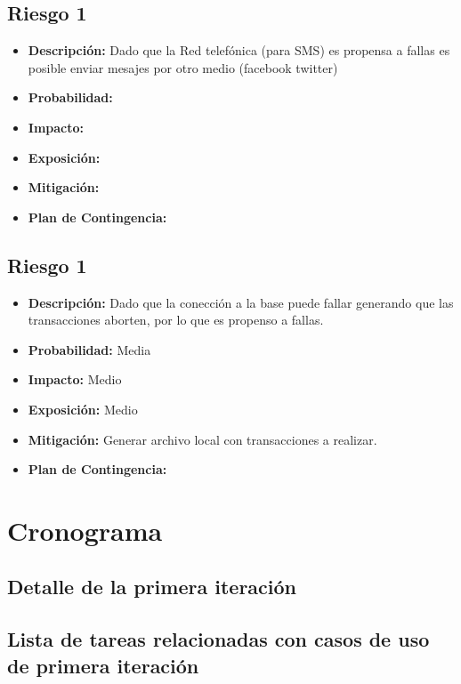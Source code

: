 \documentclass[a4paper, 11pt]{article}
\begin{document}
\subsection{Riesgo 1}
\begin{itemize}

\item \textbf{Descripci\'on:} Dado que la Red telefónica (para SMS) es propensa a fallas es posible enviar mesajes por otro medio (facebook twitter)
\item \textbf{Probabilidad:}
\item \textbf{Impacto:}
\item \textbf{Exposici\'on:}
\item \textbf{Mitigaci\'on:}
\item \textbf{Plan de Contingencia:}
\end{itemize}

\subsection{Riesgo 1}
\begin{itemize}

\item \textbf{Descripci\'on:} Dado que la conección a la base puede fallar generando que las transacciones aborten, por lo que es propenso a fallas.
\item \textbf{Probabilidad:} Media
\item \textbf{Impacto:} Medio
\item \textbf{Exposici\'on:} Medio
\item \textbf{Mitigaci\'on:} Generar archivo local con transacciones a realizar.
\item \textbf{Plan de Contingencia:} 
\end{itemize}

\newpage

\section{Cronograma}


\subsection{Detalle de la primera iteraci\'on}


\subsection{Lista de tareas relacionadas con casos de uso de primera iteraci\'on}
\end{document}

